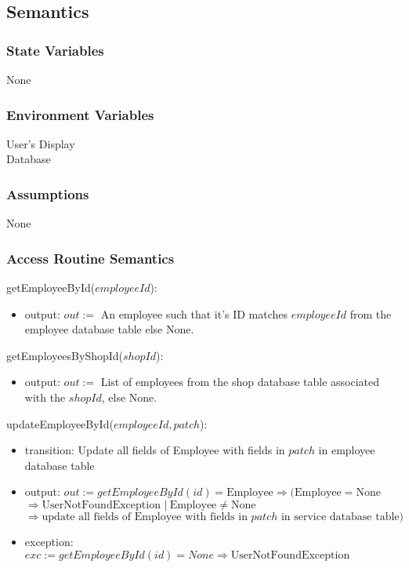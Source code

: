 \documentclass[12pt, titlepage]{article}
\begin{document}
\subsection{Semantics}

\subsubsection{State Variables}

None

\subsubsection{Environment Variables}

User's Display \\ Database

\subsubsection{Assumptions}

None

\subsubsection{Access Routine Semantics}

\noindent getEmployeeById($employeeId$):
\begin{itemize}
	\item output: $out :=$ An employee such that it's ID matches $employeeId$ from the employee database
	      table else None.
\end{itemize}

\noindent getEmployeesByShopId($shopId$):
\begin{itemize}
	\item output: $out :=$ List of employees from the shop database table associated with the $shopId$, else
	      None.
\end{itemize}

\noindent updateEmployeeById($employeeId, patch$):
\begin{itemize}
	\item transition: Update all fields of Employee with fields in $patch$ in employee database table
	\item output: $out := getEmployeeById(id) = \text{Employee} \Rightarrow (\text{Employee} = \text{None} $
		      \\ $\Rightarrow \text{UserNotFoundException } |\ \text{Employee} \neq \text{None}$ \\ $\Rightarrow
		      \text{update all fields of Employee with fields in } patch \text{ in service database table})$
	\item exception: $exc := getEmployeeById(id) = None \Rightarrow \text{UserNotFoundException}$
\end{itemize}
\end{document}
